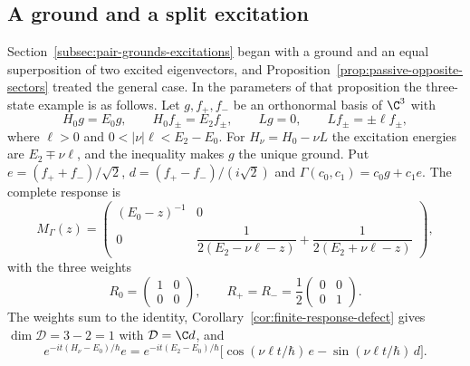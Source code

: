 \subsection{A ground and a split excitation}
\label{subsec:four-maps-three-state}

Section~\ref{subsec:pair-grounds-excitations} began with a ground and an equal superposition of two excited eigenvectors, and Proposition~\ref{prop:passive-opposite-sectors} treated the general case. In the parameters of that proposition the three-state example is as follows. Let $g,f_+,f_-$ be an orthonormal basis of $\C^3$ with
\begin{equation}
 H_0g=E_0g,\qquad H_0f_\pm=E_2f_\pm,\qquad Lg=0,\qquad Lf_\pm=\pm\ell f_\pm ,
 \label{eq:four-maps-three-state-data}
\end{equation}
where $\ell>0$ and $0<|\nu|\ell<E_2-E_0$. For $H_\nu=H_0-\nu L$ the excitation energies are $E_2\mp\nu\ell$, and the inequality makes $g$ the unique ground. Put $e=(f_++f_-)/\sqrt2$, $d=(f_+-f_-)/(i\sqrt2)$ and $\Gamma(c_0,c_1)=c_0g+c_1e$. The complete response is
\begin{equation}
 M_\Gamma(z)=\begin{pmatrix}(E_0-z)^{-1}&0\\[2pt]
   0&\dfrac{1}{2(E_2-\nu\ell-z)}+\dfrac{1}{2(E_2+\nu\ell-z)}\end{pmatrix},
 \label{eq:four-maps-three-state-response}
\end{equation}
with the three weights
\begin{equation}
 R_0=\begin{pmatrix}1&0\\0&0\end{pmatrix},\qquad R_+=R_-=\frac12\begin{pmatrix}0&0\\0&1\end{pmatrix}.
 \label{eq:four-maps-three-state-weights}
\end{equation}
The weights sum to the identity, Corollary~\ref{cor:finite-response-defect} gives $\dim\mathcal D=3-2=1$ with $\mathcal D=\C d$, and
\begin{equation}
 e^{-it(H_\nu-E_0)/\hbar}e=e^{-it(E_2-E_0)/\hbar}\bigl[\cos(\nu\ell t/\hbar)\,e-\sin(\nu\ell t/\hbar)\,d\bigr].
 \label{eq:four-maps-three-state-transfer}
\end{equation}
